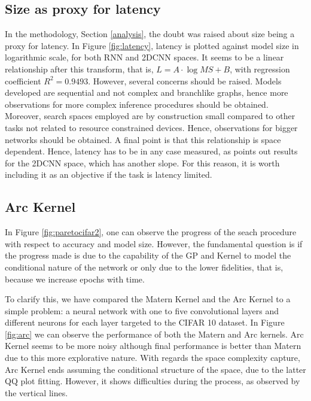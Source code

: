 \documentclass[10pt, a4paper, twocolumn]{article}
\begin{document}
\subsection{Size as proxy for latency}

In the methodology, Section \ref{analysis}, the doubt was raised about size being a proxy for latency. In Figure \ref{fig:latency}, latency is plotted against model size in logarithmic scale, for both RNN and 2DCNN spaces. It seems to be a linear relationship after this transform, that is, $L = A\cdot \log{MS} + B$, with regression coefficient $R^{2} = 0.9493$. However, several concerns should be raised. Models developed are sequential and not complex and branchlike graphs, hence more observations for more complex inference procedures should be obtained. Moreover, search spaces employed are by construction small compared to other tasks not related to resource constrained devices. Hence, observations for bigger networks should be obtained. A final point is that this relationship is space dependent. Hence, latency has to be in any case measured, as points out results for the 2DCNN space, which has another slope. For this reason, it is worth including it as an objective if the task is latency limited.

\subsection{Arc Kernel}

In Figure \ref{fig:paretocifar2}, one can observe the progress of the seach procedure with respect to accuracy and model size. However, the fundamental question is if the progress made is due to the capability of the GP and Kernel to model the conditional nature of the network or only due to the lower fidelities, that is, because we increase epochs with time. 

To clarify this, we have compared the Matern Kernel and  the Arc Kernel to a simple problem: a neural network with one to five convolutional layers and different neurons for each layer targeted to the CIFAR 10 dataset. In Figure \ref{fig:arc} we can observe the performance of both the Matern and Arc kernels. Arc Kernel seems to be more noisy although final performance is better than Matern due to this more explorative nature. With regards the space complexity capture, Arc Kernel ends assuming the conditional structure of the space, due to the latter QQ plot fitting. However, it shows difficulties during the process, as observed by the vertical lines. 
\end{document}
